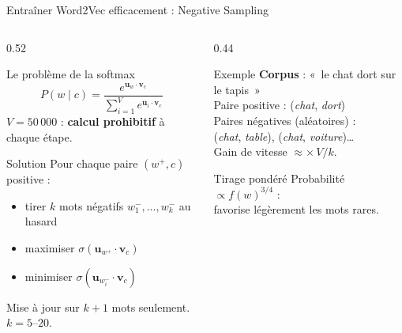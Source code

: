 \documentclass[aspectratio=169, 10pt]{beamer}
\begin{document}
\begin{frame}{Entraîner Word2Vec efficacement : Negative Sampling}
  \begin{columns}[T]
    \begin{column}{0.52\textwidth}
      \begin{alertblock}{Le problème de la softmax}
        \vspace{-2pt}
        \[
          P(w \mid c) = \frac{e^{\mathbf{u}_w \cdot \mathbf{v}_c}}{\displaystyle\sum_{i=1}^{V} e^{\mathbf{u}_i \cdot \mathbf{v}_c}}
        \]
        \vspace{-4pt}
        $V = 50\,000$ : \textbf{calcul prohibitif} à chaque étape.
      \end{alertblock}
      \begin{block}{Solution}
        \small Pour chaque paire $(w^+, c)$ positive :
        \begin{itemize}
          \item tirer $k$ mots négatifs $w_1^-, \ldots, w_k^-$ au hasard
          \item maximiser $\sigma(\mathbf{u}_{w^+} \cdot \mathbf{v}_c)$
          \item minimiser $\sigma(\mathbf{u}_{w_i^-} \cdot \mathbf{v}_c)$
        \end{itemize}
        Mise à jour sur $k{+}1$ mots seulement. $k = 5$--$20$.
      \end{block}
    \end{column}
    \begin{column}{0.44\textwidth}
      \begin{exampleblock}{Exemple}
        \small\textbf{Corpus} : «~le chat dort sur le tapis~»\\[3pt]
        Paire positive : (\emph{chat}, \emph{dort})\\[2pt]
        Paires négatives (aléatoires) :\\[1pt]
        (\emph{chat}, \emph{table}),
        (\emph{chat}, \emph{voiture})\ldots\\[3pt]
        Gain de vitesse $\approx \times\,V / k$.
      \end{exampleblock}
      \vspace{2pt}
      \begin{block}{Tirage pondéré}
        \small Probabilité $\propto f(w)^{3/4}$ :\\
        favorise légèrement les mots rares.
      \end{block}
    \end{column}
  \end{columns}
\end{frame}
\end{document}
